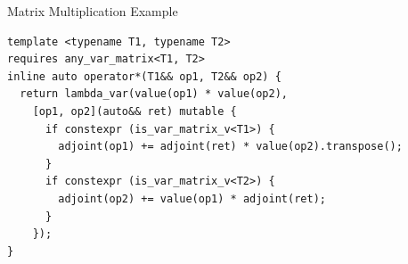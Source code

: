 \documentclass[dvipsnames, aspectratio=169]{beamer}
\newenvironment{CacheLine}[1][]{
  \begin{tikzpicture}[x=1.2cm,y=0.8cm,font=\footnotesize,>=Stealth,#1]
    \def\CacheH{1.0}   %
    \def\CacheBelow{1.0} %

}{
    \foreach \i in {1,...,7} { \draw[black!40] (\i,0) -- (\i,\CacheH); }
    \draw[line width=0.6pt, rounded corners=2pt] (0,0) rectangle (8,\CacheH);
    \foreach \i in {0,...,7} {
      \node[below=3pt, text=black!75] at (\i+0.5,0) {8B \i};
    }
  \end{tikzpicture}
}
\newcommand{\CacheColor}[2]{%
  \fill[#2, fill opacity=0.35, draw=none] (#1,0) rectangle ++(1,\CacheH);%
}
\newcommand{\CacheMarkAbove}[3][green!60!black]{%
  \draw[-{Stealth[length=3mm]}, very thick, draw=#1] (#2,\CacheH+0.36) -- (#2,\CacheH+0.04);
  \node[above, text=#1] at (#2,\CacheH+0.36) {#3};
}
\newcommand{\CacheMarkBelow}[3][green!60!black]{%
  \draw[-{Stealth[length=3mm]}, very thick, draw=#1] (#2,-\CacheBelow+0.28) -- (#2,0.02);
  \node[below, anchor=west, text=#1] at (#2,-\CacheBelow-0.2) {#3};
}
\newcommand{\CacheSetBelow}[1]{\def\CacheBelow{#1}}
\begin{document}

\begin{frame}[fragile]{Matrix Multiplication Example}
\begin{verbatim}
template <typename T1, typename T2>
requires any_var_matrix<T1, T2>
inline auto operator*(T1&& op1, T2&& op2) {
  return lambda_var(value(op1) * value(op2),
    [op1, op2](auto&& ret) mutable {
      if constexpr (is_var_matrix_v<T1>) {
        adjoint(op1) += adjoint(ret) * value(op2).transpose();
      }
      if constexpr (is_var_matrix_v<T2>) {
        adjoint(op2) += value(op1) * adjoint(ret);
      }
    });
}
\end{verbatim}
\end{frame}

\end{document}
